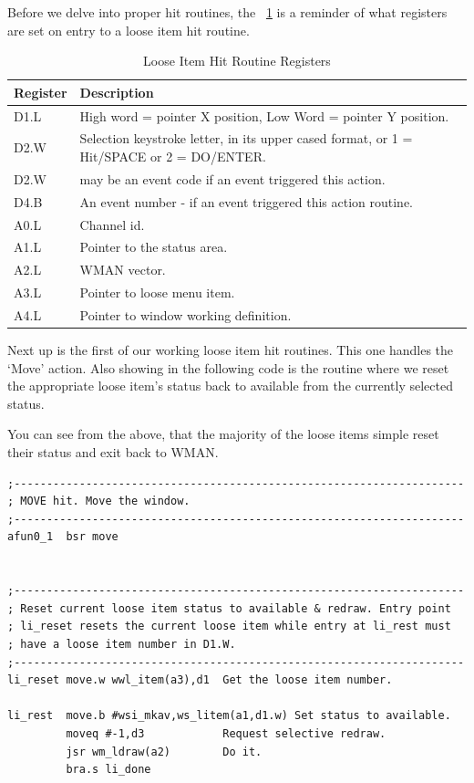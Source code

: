 Before we delve into proper hit routines, the \tablename~\ref{tab:LooseItemHitRoutineRegisters32} is a
    reminder of what registers are set on entry to a loose item hit
    routine.


\begin{table}[htbp]
\centering
\begin{tabular}{l p{}}
\toprule
\textbf{Register} &\textbf{Description}  \\
\midrule
%
D1.L & High word = pointer X position, Low Word = pointer Y position.\\
D2.W & Selection keystroke letter, in its upper cased format, or 1 = Hit/SPACE or 2 = DO/ENTER.\\ D2.W & may be an event code if an event triggered this action.\\
D4.B & An event number - if an event triggered this action routine.\\
A0.L & Channel id.\\
A1.L & Pointer to the status area.\\
A2.L & WMAN vector.\\
A3.L & Pointer to loose menu item.\\
A4.L & Pointer to window working definition.\\
%
\bottomrule
\end{tabular}
\caption{Loose Item Hit Routine Registers}
\label{tab:LooseItemHitRoutineRegisters32}
\end{table}

Next up is the first of our working loose item hit routines. This
    one handles the `Move' action. Also showing in the following code is the
    routine where we reset the appropriate loose item's status back to
    available from the currently selected status.

You can see from the above, that the majority of the loose items
    simple reset their status and exit back to
 WMAN.

\begin{lstlisting}[firstnumber=1,]
;---------------------------------------------------------------------
; MOVE hit. Move the window.
;---------------------------------------------------------------------
afun0_1  bsr move


;---------------------------------------------------------------------
; Reset current loose item status to available & redraw. Entry point
; li_reset resets the current loose item while entry at li_rest must
; have a loose item number in D1.W.
;---------------------------------------------------------------------
li_reset move.w wwl_item(a3),d1  Get the loose item number.

li_rest  move.b #wsi_mkav,ws_litem(a1,d1.w) Set status to available.
         moveq #-1,d3            Request selective redraw.
         jsr wm_ldraw(a2)        Do it.
         bra.s li_done
\end{lstlisting}

